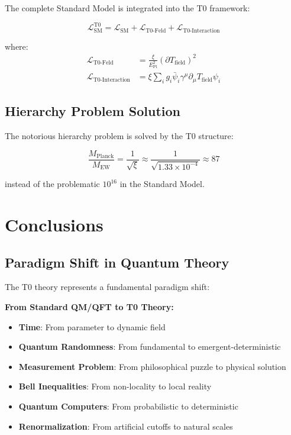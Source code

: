 \documentclass[12pt,a4paper]{article}
\newcommand{\xipar}{\xi}
\newcommand{\Tfield}{T_{\text{field}}}
\newcommand{\EPlanck}{E_{\text{Pl}}}
\begin{document}
	The complete Standard Model is integrated into the T0 framework:
	
	\begin{equation}
		\mathcal{L}_{\text{SM}}^{\text{T0}} = \mathcal{L}_{\text{SM}} + \mathcal{L}_{\text{T0-Feld}} + \mathcal{L}_{\text{T0-Interaction}}
	\end{equation}
	
	where:
	\begin{align}
		\mathcal{L}_{\text{T0-Feld}} &= \frac{\xipar}{\EPlanck^2} (\partial \Tfield)^2 \\
		\mathcal{L}_{\text{T0-Interaction}} &= \xipar \sum_i g_i \bar{\psi}_i \gamma^\mu \partial_\mu \Tfield \psi_i
	\end{align}
	
	\subsection{Hierarchy Problem Solution}
	
	The notorious hierarchy problem is solved by the T0 structure:
	
	\begin{equation}
		\frac{M_{\text{Planck}}}{M_{\text{EW}}} = \frac{1}{\sqrt{\xipar}} \approx \frac{1}{\sqrt{1.33 \times 10^{-4}}} \approx 87
	\end{equation}
	
	instead of the problematic $10^{16}$ in the Standard Model.
	
	
	\section{Conclusions}
	
	\subsection{Paradigm Shift in Quantum Theory}
	
	The T0 theory represents a fundamental paradigm shift:
	
	\begin{tcolorbox}[colback=green!5!white,colframe=green!75!black,title={T0 Revolution}]
		\textbf{From Standard QM/QFT to T0 Theory:}
		
		\begin{itemize}
			\item \textbf{Time}: From parameter to dynamic field
			\item \textbf{Quantum Randomness}: From fundamental to emergent-deterministic
			\item \textbf{Measurement Problem}: From philosophical puzzle to physical solution
			\item \textbf{Bell Inequalities}: From non-locality to local reality
			\item \textbf{Quantum Computers}: From probabilistic to deterministic
			\item \textbf{Renormalization}: From artificial cutoffs to natural scales
		\end{itemize}
	\end{tcolorbox}
	
\end{document}

